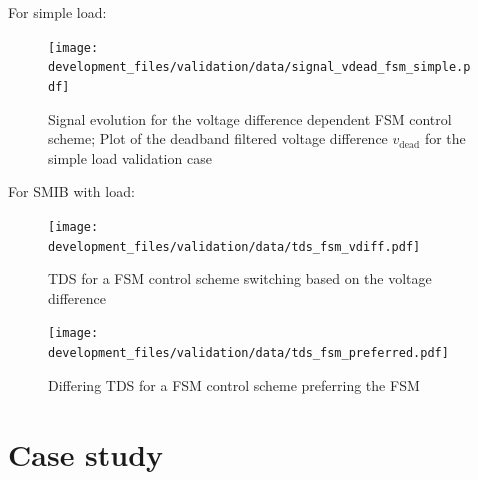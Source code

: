 For simple load:
\begin{figure}[H]
    \centering
    \texttt{[image: development\_files/validation/data/signal\_vdead\_fsm\_simple.pdf]}
    \caption{Signal evolution for the voltage difference dependent \acs{FSM} control scheme; Plot of the deadband filtered voltage difference $v_\mathrm{dead}$ for the simple load validation case}
    \label{fig:signal-vdead-fsm-simple}
\end{figure}

For SMIB with load:

\begin{figure}[H]
    \centering
    \texttt{[image: development\_files/validation/data/tds\_fsm\_vdiff.pdf]}
    \caption[\acs{TDS} for a \acs{FSM} control scheme switching based on the voltage difference]{\acs{TDS} for a \acs{FSM} control scheme switching based on the voltage difference}
    \label{fig:tds-fsm-vdiff-ext-smib}
\end{figure}


\begin{figure}[H]
    \centering
    \texttt{[image: development\_files/validation/data/tds\_fsm\_preferred.pdf]}
    \caption[Differing \acs{TDS} for a \acs{FSM} control scheme preferring the \acs{FSM}]{Differing \acs{TDS} for a \acs{FSM} control scheme preferring the \acs{FSM}}
    \label{fig:tds-fsm-preferred}
\end{figure}

\chapter{Case study}
